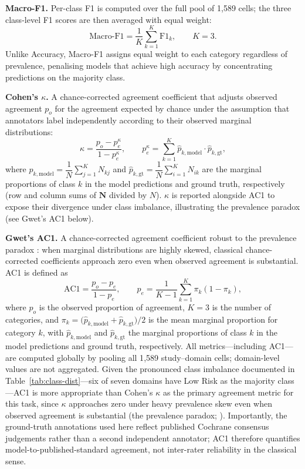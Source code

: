 \documentclass[../main.tex]{subfiles}
\begin{document}
\textbf{Macro-F1.}
Per-class F1 is computed over the full pool of 1{,}589 cells; the three class-level
F1 scores are then averaged with equal weight:
\begin{equation}
  \text{Macro-F1} = \frac{1}{K}\sum_{k=1}^{K} \mathrm{F1}_k, \qquad K = 3.
  \label{eq:macro-f1}
\end{equation}
Unlike Accuracy, Macro-F1 assigns equal weight to each category regardless of
prevalence, penalising models that achieve high accuracy by concentrating
predictions on the majority class.

\textbf{Cohen's $\kappa$.}
A chance-corrected agreement coefficient that adjusts observed agreement $p_o$
for the agreement expected by chance under the assumption that annotators label
independently according to their observed marginal distributions:
\begin{equation}
  \kappa = \frac{p_o - p_e^\kappa}{1 - p_e^\kappa},
  \qquad
  p_e^\kappa = \sum_{k=1}^{K} \hat{p}_{k,\text{model}} \cdot \hat{p}_{k,\text{gt}},
  \label{eq:kappa}
\end{equation}
where
\(
  \hat{p}_{k,\text{model}} = \dfrac{1}{N}\sum_{j=1}^{K} N_{kj}
\)
and
\(
  \hat{p}_{k,\text{gt}} = \dfrac{1}{N}\sum_{i=1}^{K} N_{ik}
\)
are the marginal proportions of class $k$ in the model predictions and ground
truth, respectively (row and column sums of $\mathbf{N}$ divided by $N$).
$\kappa$ is reported alongside AC1 to expose their divergence under class
imbalance, illustrating the prevalence paradox (see Gwet's AC1 below).

\textbf{Gwet's AC1.}
A chance-corrected agreement coefficient robust to the prevalence paradox
\citep{Gwet2008, Feinstein1990}: when marginal distributions are highly skewed,
classical chance-corrected coefficients approach zero even when observed agreement
is substantial.
AC1 is defined as
\begin{equation}
  \mathrm{AC1} = \frac{p_o - p_e}{1 - p_e},
  \qquad
  p_e = \frac{1}{K-1}\sum_{k=1}^{K} \pi_k(1 - \pi_k),
  \label{eq:ac1}
\end{equation}
where $p_o$ is the observed proportion of agreement,
$K = 3$ is the number of categories, and
$\pi_k = \bigl(\hat{p}_{k,\text{model}} + \hat{p}_{k,\text{gt}}\bigr)/2$
is the mean marginal proportion for category $k$, with $\hat{p}_{k,\text{model}}$
and $\hat{p}_{k,\text{gt}}$ the marginal proportions of class $k$ in the model
predictions and ground truth, respectively.
All metrics---including AC1---are computed globally by pooling all 1{,}589
study--domain cells; domain-level values are not aggregated.
Given the pronounced class imbalance documented in Table~\ref{tab:class-dist}---six
of seven domains have Low Risk as the majority class---AC1 is more appropriate than
Cohen's $\kappa$ as the primary agreement metric for this task, since $\kappa$
approaches zero under heavy prevalence skew even when observed agreement is
substantial (the prevalence paradox; \citealt{Feinstein1990}).
Importantly, the ground-truth annotations used here reflect published Cochrane
consensus judgements rather than a second independent annotator; AC1 therefore
quantifies model-to-published-standard agreement, not inter-rater reliability in
the classical sense.
\end{document}

